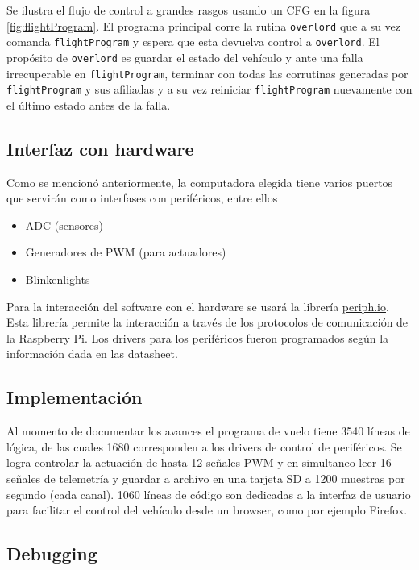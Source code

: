 Se ilustra el flujo de control a grandes rasgos usando un CFG en la figura \ref{fig:flightProgram}. El programa principal corre la rutina \texttt{overlord} que a su vez comanda \texttt{flightProgram} y espera que esta devuelva control a \texttt{overlord}. El propósito de \texttt{overlord} es guardar el estado del vehículo y ante una falla irrecuperable en \texttt{flightProgram}, terminar con todas las corrutinas generadas por \texttt{flightProgram} y sus afiliadas y a su vez reiniciar \texttt{flightProgram} nuevamente con el último estado antes de la falla.


\subsection{Interfaz con hardware}

Como se mencionó anteriormente, la computadora elegida tiene varios puertos que servirán como interfases con periféricos, entre ellos 

\begin{itemize}
    \item ADC (sensores)
    \item Generadores de PWM (para actuadores)
    \item Blinkenlights
\end{itemize}

Para la interacción del software con el hardware se usará la librería \href{https://periph.io}{periph.io}. Esta librería permite la interacción a través de los protocolos de comunicación de la Raspberry Pi. Los drivers para los periféricos fueron programados según la información dada en las datasheet.


\subsection{Implementación}

Al momento de documentar los avances el programa de vuelo tiene 3540 líneas de lógica, de las cuales 1680 corresponden a los drivers de control de periféricos. Se logra controlar la actuación de hasta 12 señales PWM y en simultaneo leer 16 señales de telemetría y guardar a archivo en una tarjeta SD a 1200 muestras por segundo (cada canal). 1060 líneas de código son dedicadas a la interfaz de usuario para facilitar el control del vehículo desde un browser, como por ejemplo Firefox.

\subsection{Debugging}

